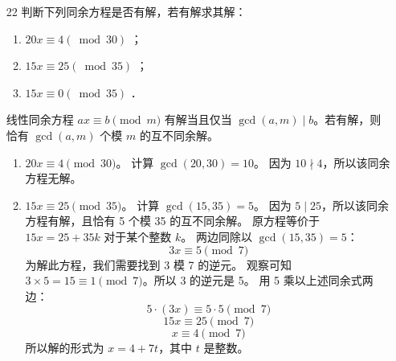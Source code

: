 \begin{enumerate}
\begin{proof}
        我们可以继续这个过程。假设我们已经证明了 $x_1 = x'_1, x_2 = x'_2, \dots, x_{j-1} = x'_{j-1}$。
        将这些代入 $(*)$ 并消去相应的项，然后两边同除以 $m_1 m_2 \cdots m_{j-1}$，我们得到
        \begin{align*}
        &x_j+m_j x_{j+1}+\cdots+m_j \cdots m_{k-1} x_k \\
        \equiv &x'_j+m_j x'_{j+1}+\cdots+m_j \cdots m_{k-1} x'_k \pmod{m_j m_{j+1} \cdots m_k}
        \end{align*}
        考虑模 $m_j$，得到
        \[ x_j \equiv x'_j \pmod{m_j} \]
        因为 $x_j, x'_j$ 都来自模 $m_j$ 的一个完全剩余系，所以 $x_j = x'_j$。
        通过归纳，我们可以证明对所有的 $j=1, 2, \dots, k$，都有 $x_j = x'_j$。
        因此，如果两个 $x$ 值关于模 $M$同余，那么它们必定是由完全相同的 $(x_1, \dots, x_k)$ 序列生成的。
        这证明了由不同序列生成的 $M$ 个 $x$ 值两两关于模 $M$ 不同余。
        综上所述，这些 $x$ 值构成了模 $M$ 的一个完全剩余系。
    \end{proof}
    \item[22] 判断下列同余方程是否有解，若有解求其解：
    \begin{enumerate}
        \item $20 x \equiv 4(\bmod 30)$ ；
        \item $15 x \equiv 25(\bmod 35)$ ；
        \item $15 x \equiv 0(\bmod 35)$ ．
    \end{enumerate}
    \begin{solution}
        线性同余方程 $ax \equiv b \pmod m$ 有解当且仅当 $\gcd(a, m) \mid b$。若有解，则恰有 $\gcd(a, m)$ 个模 $m$ 的互不同余解。
        \begin{enumerate}
            \item $20 x \equiv 4 \pmod{30}$。
            计算 $\gcd(20, 30) = 10$。
            因为 $10 \nmid 4$，所以该同余方程无解。
            \item $15 x \equiv 25 \pmod{35}$。
            计算 $\gcd(15, 35) = 5$。
            因为 $5 \mid 25$，所以该同余方程有解，且恰有 5 个模 35 的互不同余解。
            原方程等价于 $15x = 25 + 35k$ 对于某个整数 $k$。
            两边同除以 $\gcd(15, 35)=5$：
            \[ 3x \equiv 5 \pmod{7} \]
            为解此方程，我们需要找到 3 模 7 的逆元。
            观察可知 $3 \times 5 = 15 \equiv 1 \pmod 7$。所以 3 的逆元是 5。
            用 5 乘以上述同余式两边：
            \[ 5 \cdot (3x) \equiv 5 \cdot 5 \pmod 7 \]
            \[ 15x \equiv 25 \pmod 7 \]
            \[ x \equiv 4 \pmod 7 \]
            所以解的形式为 $x = 4 + 7t$，其中 $t$ 是整数。

\end{enumerate}
\end{solution}
\end{enumerate}
